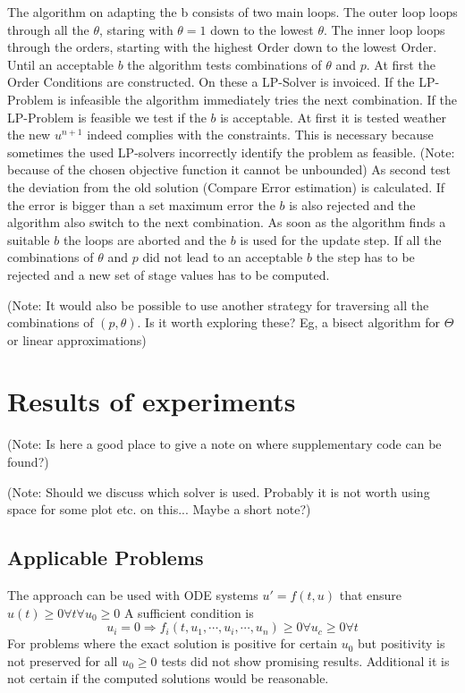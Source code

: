 \documentclass{article}
\begin{document}
The algorithm on adapting the b consists of two main loops. The outer loop loops through all the $\theta$, staring with $\theta = 1$ down to the lowest $\theta$. The inner loop loops through the orders, starting with the highest Order down to the lowest Order. 
Until an acceptable $b$ the algorithm tests combinations of $\theta$ and $p$. At first the Order Conditions are constructed. On these a LP-Solver is invoiced. If the LP-Problem is infeasible the algorithm immediately tries the next combination. If the LP-Problem is feasible we test if the $b$ is acceptable. At first it is tested weather the new $u^{n+1}$ indeed complies with the constraints. This is necessary because sometimes the used LP-solvers incorrectly identify the problem as feasible. (Note: because of the chosen objective function it cannot be unbounded) As second test the deviation from the old solution (Compare Error estimation) is calculated. If the error is bigger than a set maximum error the $b$ is also rejected and the algorithm also switch to the next combination.
As soon as the algorithm finds a suitable $b$ the loops are aborted and the $b$ is used for the update step.
If all the combinations of $\theta$ and $p$ did not lead to an acceptable $b$ the step has to be rejected and a new set of stage values has to be computed.

(Note: It would also be possible to use another strategy for traversing all the combinations of $(p,\theta)$. Is it worth exploring these? Eg, a bisect algorithm for $\Theta$ or linear approximations)


\section{Results of experiments}\label{sec:Numeric_Results}

(Note: Is here a good place to give a note on where supplementary code can be found?)

(Note: Should we discuss which solver is used. Probably it is not worth using space for some plot etc. on this... Maybe a short note?)

\subsection{Applicable Problems}\label{sec:app_problem}
The approach can be used with ODE systems $u' = f(t,u)$ that ensure  $u(t) \geq 0 \forall t \forall {  u_0 \geq 0}$ 
A sufficient condition is  
\begin{equation}
u_i=0 \Rightarrow f_i(t,u_1,\cdots,u_i,\cdots,u_n) \geq 0  \forall {u_c \geq 0} \forall {t}
\end{equation}
For problems where the exact solution is positive for certain $u_0$ but positivity is not preserved for all $u_0 \geq 0$ tests did not show promising results. Additional it is not certain if the computed solutions would be reasonable.
\end{document}
